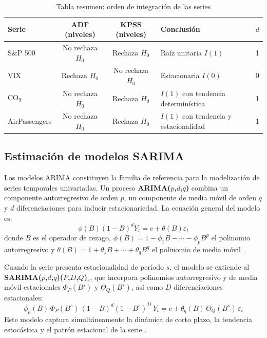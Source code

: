 \documentclass[12pt, a4paper]{article}
\begin{document}
\begin{table}[H]
    \centering
    \caption{Tabla resumen: orden de integración de las series}
    \label{tab:resumen_integracion}
    \begin{tabular}{lccll}
        \toprule
        \textbf{Serie} & \textbf{ADF (niveles)} & \textbf{KPSS (niveles)} & \textbf{Conclusión} & \textbf{$d$} \\
        \midrule
        S\&P 500      & No rechaza $H_0$ & Rechaza $H_0$ & Raíz unitaria $I(1)$                        & 1 \\
        VIX           & Rechaza $H_0$    & No rechaza $H_0$ & Estacionaria $I(0)$                      & 0 \\
        CO\textsubscript{2} & No rechaza $H_0$ & Rechaza $H_0$ & $I(1)$ con tendencia determinística  & 1 \\
        AirPassengers & No rechaza $H_0$ & Rechaza $H_0$ & $I(1)$ con tendencia y estacionalidad       & 1 \\
        \bottomrule
    \end{tabular}
\end{table}

\subsection{Estimación de modelos SARIMA}
\label{subsec:arima_estimacion}

Los modelos ARIMA constituyen la familia de referencia para la modelización de series temporales univariadas. Un proceso \textbf{ARIMA($p$,$d$,$q$)} combina un componente autorregresivo de orden $p$, un componente de media móvil de orden $q$ y $d$ diferenciaciones para inducir estacionariedad. La ecuación general del modelo es:
$$\phi(B)(1-B)^d Y_t = c + \theta(B)\varepsilon_t$$
donde $B$ es el operador de rezago, $\phi(B) = 1 - \phi_1 B - \cdots - \phi_p B^p$ el polinomio autorregresivo y $\theta(B) = 1 + \theta_1 B + \cdots + \theta_q B^q$ el polinomio de media móvil \cite{box2008}.

Cuando la serie presenta estacionalidad de período $s$, el modelo se extiende al \textbf{SARIMA($p$,$d$,$q$)($P$,$D$,$Q$)$_s$}, que incorpora polinomios autorregresivo y de media móvil estacionales $\Phi_P(B^s)$ y $\Theta_Q(B^s)$, así como $D$ diferenciaciones estacionales:
$$\phi_p(B)\,\Phi_P(B^s)\,(1-B)^d(1-B^s)^D\, Y_t = c + \theta_q(B)\,\Theta_Q(B^s)\,\varepsilon_t$$
Este modelo captura simultáneamente la dinámica de corto plazo, la tendencia estocástica y el patrón estacional de la serie \cite{hyndman2018}.
\end{document}
